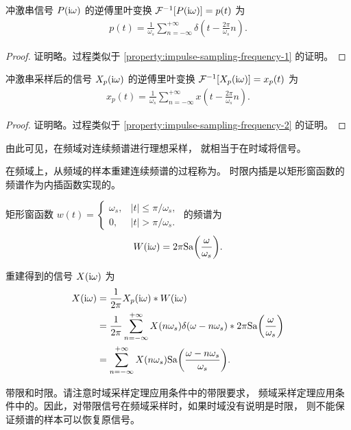 \begin{property}
    冲激串信号 $P(\mathrm{i}\omega)$ 的逆傅里叶变换 $\mathcal{F}^{-1}[P(\mathrm{i}\omega)] = p(t)$ 为
    \begin{align*}
        p(t) = \frac{1}{\omega_s}\sum_{n = -\infty}^{+\infty}\delta(t - \frac{2\pi}{\omega_s}n).
    \end{align*}
\end{property}

\begin{proof}
    证明略。过程类似于 \ref{property:impulse-sampling-frequency-1} 的证明。
\end{proof}

\begin{property}
    冲激串采样后的信号 $X_p(\mathrm{i}\omega)$ 的逆傅里叶变换 $\mathcal{F}^{-1}[X_p(\mathrm{i}\omega)] = x_p(t)$ 为
    \begin{align*}
        x_p(t) = \frac{1}{\omega_s}\sum_{n = -\infty}^{+\infty}x(t - \frac{2\pi}{\omega_s}n).
    \end{align*}
\end{property}

\begin{proof}
    证明略。过程类似于 \ref{property:impulse-sampling-frequency-2} 的证明。
\end{proof}

\begin{remark}
    由此可见，在频域对连续频谱进行理想采样，
    就相当于在时域将信号。
\end{remark}

\begin{definition}[时限内插]
    在频域上，从频域的样本重建连续频谱的过程称为。
    时限内插是以矩形窗函数的频谱作为内插函数实现的。

    矩形窗函数 $w(t) = \begin{cases}
        \omega_s, & |t| \le \pi/\omega_s, \\
        0, & |t| > \pi/\omega_s.
    \end{cases}$ 的频谱为
    \begin{align*}
        W(\mathrm{i}\omega) = 2\pi \mathrm{Sa}{\left(\frac{\omega}{\omega_s}\right)}.
    \end{align*}

    重建得到的信号 $X(\mathrm{i}\omega)$ 为
    \begin{align*}
        X(\mathrm{i}\omega) & = \frac{1}{2\pi}X_p(\mathrm{i}\omega) * W(\mathrm{i}\omega) \\
        & = \frac{1}{2\pi} \sum_{n = -\infty}^{+\infty}X(n\omega_s)\delta(\omega - n\omega_s) * 2\pi\mathrm{Sa}{\left(\frac{\omega}{\omega_s}\right)} \\
        & = \sum_{n = -\infty}^{+\infty}X(n\omega_s)\mathrm{Sa}{\left(\frac{\omega - n\omega_s}{\omega_s}\right)}.
    \end{align*}
\end{definition}

\begin{note}
    带限和时限。请注意时域采样定理应用条件中的{带限要求}，
    频域采样定理应用条件中的。因此，对带限信号在频域采样时，如果时域没有说明是时限，
    则不能保证频谱的样本可以恢复原信号。
\end{note}
